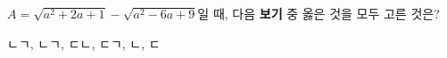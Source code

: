 $A=\sqrt{a^2+2a+1}-\sqrt{a^2-6a+9}$일 때, 다음 \textbf{보기} 중 옳은 것을 모두 고른 것은?
\begin{choices32}{ㄴ}{ㄱ, ㄴ}{ㄱ, ㄷ}{ㄴ, ㄷ}{ㄱ, ㄴ, ㄷ}\end{choices32}
